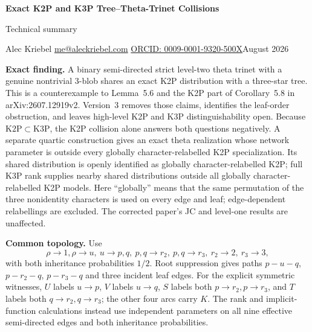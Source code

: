 \documentclass[10pt]{article}
\begin{document}
\begin{center}
{\Large\bfseries Exact K2P and K3P Tree--Theta-Trinet Collisions}\par
{\large Technical summary}\par
Alec Kriebel \quad \href{mailto:me@aleckriebel.com}{me@aleckriebel.com} \quad \href{https://orcid.org/0009-0001-9320-500X}{ORCID: 0009-0001-9320-500X}\hfill August 2026
\end{center}
\textbf{Exact finding.} A binary semi-directed strict level-two theta trinet with a genuine nontrivial $3$-blob shares an exact K2P distribution with a three-star tree. This is a counterexample to Lemma~5.6 and the K2P part of Corollary~5.8 in arXiv:2607.12919v2. Version~3 removes those claims, identifies the leaf-order obstruction, and leaves high-level K2P and K3P distinguishability open. Because $\mathrm{K2P}\subset\mathrm{K3P}$, the K2P collision alone answers both questions negatively. A separate quartic construction gives an exact theta realization whose network parameter is outside every globally character-relabelled K2P specialization. Its shared distribution is openly identified as globally character-relabelled K2P; full K3P rank supplies nearby shared distributions outside all globally character-relabelled K2P models. Here ``globally'' means that the same permutation of the three nonidentity characters is used on every edge and leaf; edge-dependent relabellings are excluded. The corrected paper's JC and level-one results are unaffected.

\textbf{Common topology.} Use
\[
\rho\to1,\rho\to u,\ u\to p,q,\ p,q\to r_2,\ p,q\to r_3,\ r_2\to2,\ r_3\to3,
\]
with both inheritance probabilities $1/2$. Root suppression gives paths $p-u-q$, $p-r_2-q$, $p-r_3-q$ and three incident leaf edges.
For the explicit symmetric witnesses, $U$ labels $u\to p$, $V$ labels $u\to q$, $S$ labels both $p\to r_2,p\to r_3$, and $T$ labels both $q\to r_2,q\to r_3$; the other four arcs carry $K$. The rank and implicit-function calculations instead use independent parameters on all nine effective semi-directed edges and both inheritance probabilities.
\end{document}
